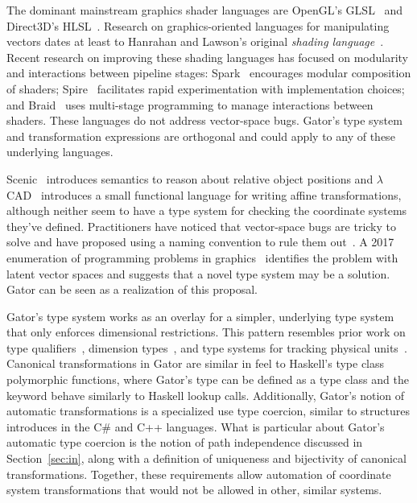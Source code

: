 \documentclass[../main.tex]{subfiles}
\begin{document}
{The dominant mainstream graphics shader languages are OpenGL's GLSL~\cite{glsl} and Direct3D's HLSL~\cite{direct3d}.
Research on graphics-oriented languages for manipulating vectors dates at least to Hanrahan and Lawson's original \emph{shading language}~\cite{hanrahan90}.
Recent research on improving these shading languages has focused on modularity and interactions between pipeline stages:
Spark~\cite{spark} encourages modular composition of shaders;
Spire~\cite{spire} facilitates rapid experimentation with implementation choices;
and Braid~\cite{braid} uses multi-stage programming to manage interactions between shaders.
These languages do not address vector-space bugs.
Gator's type system and transformation expressions are orthogonal and could apply to any of these underlying languages.

Scenic~\cite{spatial} introduces semantics to reason about relative object positions and $\lambda$CAD~\cite{acad} introduces a small functional language for writing affine transformations, although neither seem to have a type system for checking the coordinate systems they've defined.
Practitioners have noticed that vector-space bugs are tricky to solve and have proposed using a naming convention to rule them out~\cite{naming}.
A 2017 enumeration of programming problems in graphics~\cite{lfogl} identifies the problem with latent vector spaces and suggests that a novel type system may be a solution.
Gator can be seen as a realization of this proposal.

Gator's type system works as an overlay for a simpler, underlying type system that only enforces dimensional restrictions.
This pattern resembles prior work on type qualifiers~\cite{cqual}, dimension types~\cite{dimension}, and type systems for tracking physical units~\cite{unit}.
Canonical transformations in Gator are similar in feel to Haskell's type class polymorphic functions, where Gator's  type can be defined as a type class and the  keyword behave similarly to Haskell lookup calls.
Additionally, Gator's notion of automatic transformations is a specialized use type coercion, similar to structures introduces in the C\# and C++ languages.
What is particular about Gator's automatic type coercion is the notion of path independence discussed in Section~\ref{sec:in}, along with a definition of uniqueness and bijectivity of canonical transformations. Together, these requirements allow automation of coordinate system transformations that would not be allowed in other, similar systems.

}
\end{document}
